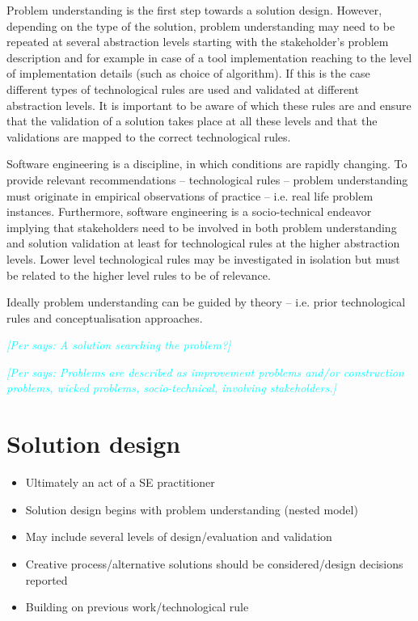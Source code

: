 \documentclass[graybox]{svmult}
\newcommand{\per}[1]{\textcolor{cyan}{{\it [Per says: #1]}}}
\newcommand{\per}[1]{}
\begin{document}

Problem understanding is the first step towards a solution design. However, depending on the type of the solution, problem understanding may need to be repeated at several abstraction levels starting with the stakeholder's problem description and for example in case of a tool implementation reaching to the level of implementation details (such as  choice of algorithm). If this is the case different types of technological rules are used and validated at different abstraction levels. It is important to be aware of which these rules are and ensure that the validation of a solution takes place at all these levels and that the validations are mapped to the correct technological rules. 

Software engineering is a discipline, in which conditions are rapidly changing. To provide relevant recommendations -- technological rules -- problem understanding must originate in empirical observations of practice -- i.e. real life problem instances. Furthermore, software engineering is a socio-technical endeavor implying that stakeholders need to be involved in both problem understanding and solution validation at least for technological rules at the higher abstraction levels. Lower level technological rules may be investigated in isolation but must be related to the higher level rules to be of relevance. 


Ideally problem understanding can be guided by theory -- i.e. prior technological rules and conceptualisation approaches. 



\per{A solution searching the problem?}

\per{Problems are described as improvement problems and/or construction problems, wicked problems, socio-technical, involving stakeholders.} 



\section{Solution design}

\begin{itemize}
\item Ultimately an act of a SE practitioner
\item Solution design begins with problem understanding (nested model)
\item May include several levels of design/evaluation and validation 
\item Creative process/alternative solutions should be considered/design decisions reported
\item Building on previous work/technological rule	
\end{itemize}
\end{document}

